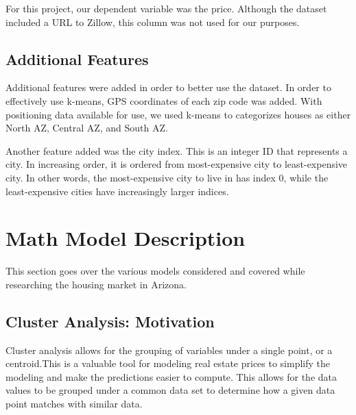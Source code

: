 \documentclass[12pt]{article}
\begin{document}
For this project, our dependent variable was the price.
Although the dataset included a URL to Zillow, this column was not used for our purposes.

\subsection{Additional Features}
Additional features were added in order to better use the dataset.
In order to effectively use k-means, GPS coordinates of each zip code was added.
With positioning data available for use, we used k-means to categorizes houses as either North AZ, Central AZ, and South AZ.

Another feature added was the city index.
This is an integer ID that represents a city.
In increasing order, it is ordered from most-expensive city to least-expensive city.
In other words, the most-expensive city to live in has index 0, while the least-expensive cities have increasingly larger indices.


\section{Math Model Description}
This section goes over the various models considered and covered while researching the housing market in Arizona.
\subsection{Cluster Analysis: Motivation}
Cluster analysis allows for the grouping of variables under a single point, or a centroid.This is a valuable tool for modeling real estate prices to simplify the modeling and make the predictions easier to compute. This allows for the data values to be grouped under a common data set to determine how a given data point matches with similar data.
\end{document}

